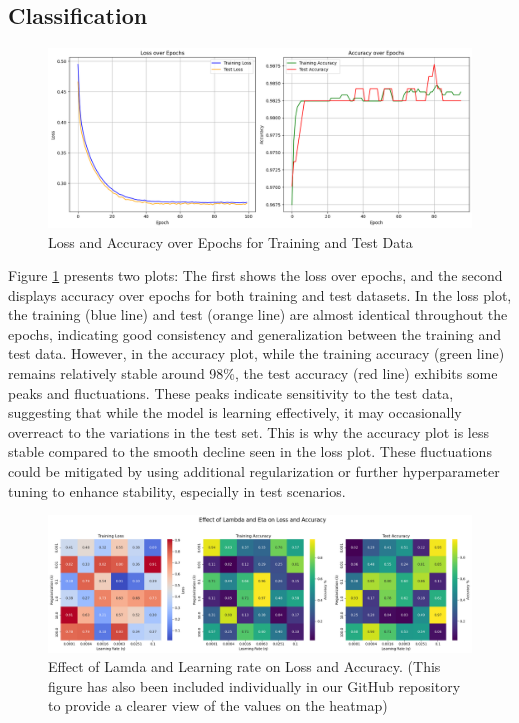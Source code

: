 \documentclass{article}
\newcommand{\0}{\mathbf{0}}
\newcommand{\1}{\mathbf{1}}
\begin{document}
\subsection{Classification}


\begin{figure}[h!]
    \centering
    \includegraphics[width=1.2\linewidth]{Training_Val_loss_accuracy_TaskD.png}
    \caption{Loss and Accuracy over Epochs for Training and Test Data}
    \label{Training_Val_loss_accuracy_TaskD}
\end{figure}


Figure \ref{Training_Val_loss_accuracy_TaskD} presents two plots: The first shows the loss over epochs, and the second displays accuracy over epochs for both training and test datasets. In the loss plot, the training (blue line) and test (orange line) are almost identical throughout the epochs, indicating good consistency and generalization between the training and test data. However, in the accuracy plot, while the training accuracy (green line) remains relatively stable around 98\%, the test accuracy (red line) exhibits some peaks and fluctuations. These peaks indicate sensitivity to the test data, suggesting that while the model is learning effectively, it may occasionally overreact to the variations in the test set. This is why the accuracy plot is less stable compared to the smooth decline seen in the loss plot. These fluctuations could be mitigated by using additional regularization or further hyperparameter tuning to enhance stability, especially in test scenarios.



\begin{figure}[h!]
    \centering
    \includegraphics[width=1.2\linewidth]{Lambda_ETA_on_loss_Accuracy_TaskD_2.png}
    \caption{Effect of Lamda and Learning rate on Loss and Accuracy. (This figure has also been included individually in our GitHub repository to provide a clearer view of the values on the heatmap)}
    \label{Lambda_ETA_on_loss_Accuracy_TaskD_2}
\end{figure}
\end{document}
